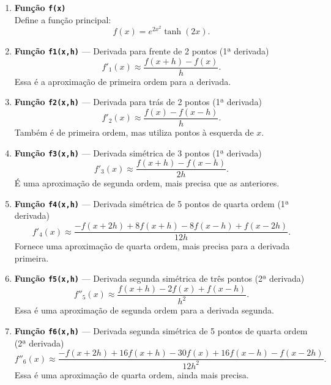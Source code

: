 \begin{enumerate}
	\item \textbf{Função \texttt{f(x)}} \\
	Define a função principal:
	\begin{equation}
		f(x) = e^{2x^2} \tanh(2x).
	\end{equation}

	\item \textbf{Função \texttt{f1(x,h)}} — Derivada para frente de 2 pontos 
	(1ª derivada)
	\begin{equation}
		f'_1(x) \approx \frac{f(x+h) - f(x)}{h}.
	\end{equation}
	Essa é a aproximação de primeira ordem para a derivada.

	\item \textbf{Função \texttt{f2(x,h)}} — Derivada para trás de 2 pontos
	(1ª derivada)
	\begin{equation}
		f'_2(x) \approx \frac{f(x) - f(x-h)}{h}.
	\end{equation}
	Também é de primeira ordem, mas utiliza pontos à esquerda de $x$.

	\item \textbf{Função \texttt{f3(x,h)}} — Derivada simétrica de 3 pontos
	(1ª derivada)
	\begin{equation}
		f'_3(x) \approx \frac{f(x+h) - f(x-h)}{2h}.
	\end{equation}
	É uma aproximação de segunda ordem, mais precisa que as anteriores.

	\item \textbf{Função \texttt{f4(x,h)}} — Derivada simétrica de 5 pontos 
	de quarta ordem (1ª derivada)
	\begin{equation}
		f'_4(x) \approx 
		\frac{-f(x+2h) + 8f(x+h) - 8f(x-h) + f(x-2h)}{12h}.
	\end{equation}
	Fornece uma aproximação de quarta ordem, mais precisa para 
	a derivada primeira.

	\item \textbf{Função \texttt{f5(x,h)}} — Derivada segunda simétrica de três pontos
	(2ª derivada)
	\begin{equation}
		f''_5(x) \approx 
		\frac{f(x+h) - 2f(x) + f(x-h)}{h^2}.
	\end{equation}
	Essa é uma aproximação de segunda ordem para a derivada segunda.

	\item \textbf{Função \texttt{f6(x,h)}} — Derivada segunda simétrica de 5 pontos
	de quarta ordem (2ª derivada)
	\begin{equation}
		f''_6(x) \approx 
		\frac{-f(x+2h) + 16f(x+h) - 30f(x) 
		+ 16f(x-h) - f(x-2h)}{12h^2}.
	\end{equation}
	Essa é uma aproximação de quarta ordem, ainda mais precisa.
\end{enumerate}

